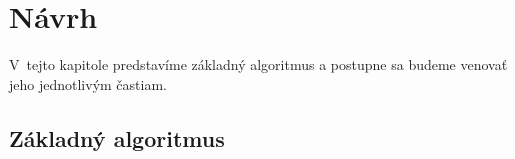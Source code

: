 \chapter{Návrh}\label{chap:design}

V~tejto kapitole predstavíme základný algoritmus a postupne sa budeme venovať jeho jednotlivým častiam.
\bigskip

\section{Základný algoritmus}

